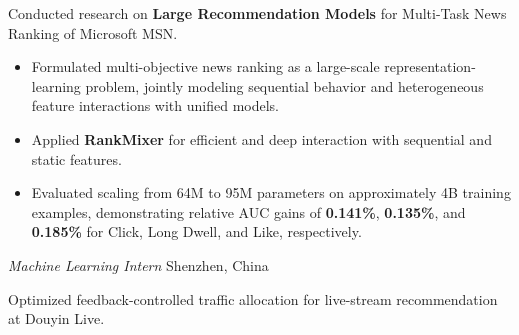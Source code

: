 \documentclass{resume}
\begin{document}
Conducted research on \textbf{Large Recommendation Models} for Multi-Task News Ranking of Microsoft MSN.
\vspace{-0.1em}
\begin{itemize}
  \item Formulated multi-objective news ranking as a large-scale representation-learning problem, jointly modeling sequential behavior and heterogeneous feature interactions with unified models.
  \item Applied \textbf{RankMixer} for efficient and deep interaction with sequential and static features. 
  \item Evaluated scaling from 64M to 95M parameters on approximately 4B training examples, demonstrating relative AUC gains of \textbf{0.141\%}, \textbf{0.135\%}, and \textbf{0.185\%} for Click, Long Dwell, and Like, respectively.
\end{itemize}




\textit{Machine Learning Intern}
\hfill Shenzhen, China

Optimized feedback-controlled traffic allocation for live-stream recommendation at Douyin Live.

\end{document}
